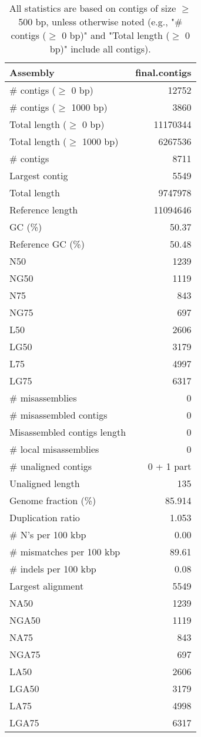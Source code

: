 \documentclass[12pt,a4paper]{article}
\begin{document}
\begin{table}[ht]
\begin{center}
\caption{All statistics are based on contigs of size $\geq$ 500 bp, unless otherwise noted (e.g., "\# contigs ($\geq$ 0 bp)" and "Total length ($\geq$ 0 bp)" include all contigs).}
\begin{tabular}{|l*{1}{|r}|}
\hline
Assembly & final.contigs \\ \hline
\# contigs ($\geq$ 0 bp) & 12752 \\ \hline
\# contigs ($\geq$ 1000 bp) & 3860 \\ \hline
Total length ($\geq$ 0 bp) & 11170344 \\ \hline
Total length ($\geq$ 1000 bp) & 6267536 \\ \hline
\# contigs & 8711 \\ \hline
Largest contig & 5549 \\ \hline
Total length & 9747978 \\ \hline
Reference length & 11094646 \\ \hline
GC (\%) & 50.37 \\ \hline
Reference GC (\%) & 50.48 \\ \hline
N50 & 1239 \\ \hline
NG50 & 1119 \\ \hline
N75 & 843 \\ \hline
NG75 & 697 \\ \hline
L50 & 2606 \\ \hline
LG50 & 3179 \\ \hline
L75 & 4997 \\ \hline
LG75 & 6317 \\ \hline
\# misassemblies & 0 \\ \hline
\# misassembled contigs & 0 \\ \hline
Misassembled contigs length & 0 \\ \hline
\# local misassemblies & 0 \\ \hline
\# unaligned contigs & 0 + 1 part \\ \hline
Unaligned length & 135 \\ \hline
Genome fraction (\%) & 85.914 \\ \hline
Duplication ratio & 1.053 \\ \hline
\# N's per 100 kbp & 0.00 \\ \hline
\# mismatches per 100 kbp & 89.61 \\ \hline
\# indels per 100 kbp & 0.08 \\ \hline
Largest alignment & 5549 \\ \hline
NA50 & 1239 \\ \hline
NGA50 & 1119 \\ \hline
NA75 & 843 \\ \hline
NGA75 & 697 \\ \hline
LA50 & 2606 \\ \hline
LGA50 & 3179 \\ \hline
LA75 & 4998 \\ \hline
LGA75 & 6317 \\ \hline
\end{tabular}
\end{center}
\end{table}
\end{document}
